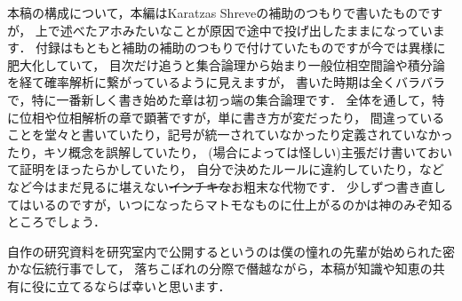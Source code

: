 本稿の構成について，本編はKaratzas Shreveの補助のつもりで書いたものですが，
上で述べたアホみたいなことが原因で途中で投げ出したままになっています．
付録はもともと補助の補助のつもりで付けていたものですが今では異様に肥大化していて，
目次だけ追うと集合論理から始まり一般位相空間論や積分論を経て確率解析に繋がっているように見えますが，
書いた時期は全くバラバラで，特に一番新しく書き始めた章は初っ端の集合論理です．
全体を通して，特に位相や位相解析の章で顕著ですが，単に書き方が変だったり，
間違っていることを堂々と書いていたり，記号が統一されていなかったり定義されていなかったり，キソ概念を誤解していたり，
(場合によっては怪しい)主張だけ書いておいて証明をほったらかしていたり，
自分で決めたルールに違約していたり，などなど今はまだ見るに堪えない\sout{インチキな}お粗末な代物です．
少しずつ書き直してはいるのですが，いつになったらマトモなものに仕上がるのかは神のみぞ知るところでしょう．

自作の研究資料を研究室内で公開するというのは僕の憧れの先輩が始められた密かな伝統行事でして，
落ちこぼれの分際で僭越ながら，本稿が知識や知恵の共有に役に立てるならば幸いと思います．
\\
\\
\begin{comment}
\\
\\
読み返すたびに間違いや気に食わない記述が見つかるので，どうもこのノートには間違いや気に食わない記述が可算無限個存在しているようです．
となると，このノートの文字数はどう見ても\sout{有限}有界ですからどこかに間違いや気に食わない記述が集積している筈で...ああ，位相の章でした．

右連続な二乗可積分マルチンゲールの二次変分の存在はDoob-Meyer分解により示すのが一般論ですが，
その延長で連続マルチンゲールの連続な二次変分の存在を示すとなるとフィルトレーションはusualのままです．
しかし実際は，連続の場合ならフィルトレーションの右連続性は課さずに，
つまりDoob-Meyer分解とは別のルートで連続な二次変分が得られます．
右連続な場合も連続版の証明の真似でいけそうだと踏んで挑戦してみたら，
ナチュラル性に関して厄介な問題が浮上してうまくいきませんでした．それにしても右連続な場合と連続な場合とで証明が大きく異なるのは疲れます．
なんとか似た証明が出来ないものか考えていたり探していたりするので，気が向いたら情報を下さい．
\\
\\
\rightline{2019年5月}
\end{comment}